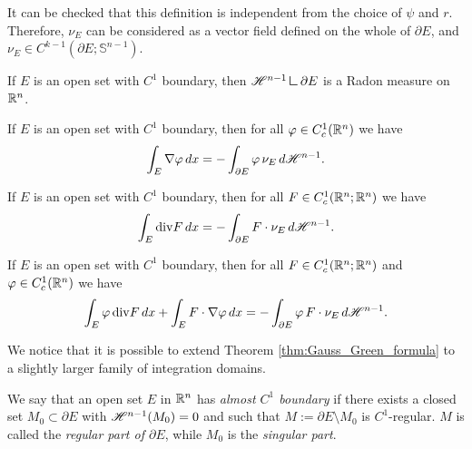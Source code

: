 It can be checked that this definition is independent from the choice of $\psi$ and $r$. Therefore, $\nu_{E}$ can be considered as a vector field defined on the whole of $\partial E$, and $\nu_{E} \in C^{k - 1}(\partial E; \mathbb{S}^{n - 1})$.

\begin{remark}
If $E$ is an open set with $C^{1}$ boundary, then $\Haus{n - 1} \res \partial E$ is a Radon measure on $\mathbb{R}^{n}$.
\end{remark}

\begin{theorem} \label{thm:Gauss_Green_formula}
If $E$ is an open set with $C^{1}$ boundary, then for all $\varphi \in C^{1}_{c}(\mathbb{R}^{n})$ we have
\begin{equation} \label{eq:Gauss_Green_formula}
\int_{E} \nabla \varphi \,dx = - \int_{\partial E} \varphi \, \nu_{E} \, d \mathscr{H}^{n - 1}.
\end{equation}
\end{theorem}

\begin{corollary} \label{cor:divergence_theorem}
If $E$ is an open set with $C^{1}$ boundary, then for all $F \in C^{1}_{c}(\mathbb{R}^{n}; \mathbb{R}^{n})$ we have
\begin{equation} \label{eq:divergence_theorem}
\int_{E} \mathrm{div} F \,dx = - \int_{\partial E} F \cdot \nu_{E} \, d \mathscr{H}^{n - 1}.
\end{equation}
\end{corollary}

\begin{corollary} \label{cor:integration_parts_formula}
If $E$ is an open set with $C^{1}$ boundary, then for all $F \in C^{1}_{c}(\mathbb{R}^{n}; \mathbb{R}^{n})$ and $\varphi \in C^{1}_{c}(\mathbb{R}^{n})$ we have
\begin{equation} \label{eq:integration_parts_formula}
\int_{E} \varphi \, \mathrm{div} F \, dx + \int_{E} F \cdot \nabla \varphi \, dx = - \int_{\partial E} \varphi \, F \cdot \nu_{E} \, d \mathscr{H}^{n - 1}.
\end{equation}
\end{corollary}

We notice that it is possible to extend Theorem \ref{thm:Gauss_Green_formula} to a slightly larger family of integration domains.

\begin{definition}
We say that an open set $E$ in $\mathbb{R}^{n}$ has {\em almost $C^{1}$ boundary} if there exists a closed set $M_{0} \subset \partial E$ with $\mathscr{H}^{n - 1}(M_{0}) = 0$ and such that $M:= \partial E \setminus M_{0}$ is $C^{1}$-regular. $M$ is called the {\em regular part of $\partial E$}, while $M_{0}$ is the {\em singular part}.
\end{definition}


